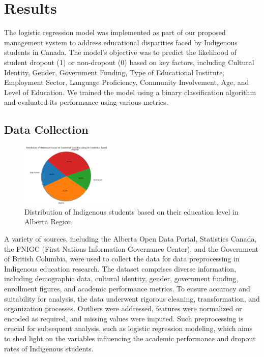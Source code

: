\documentclass[conference]{IEEEtran}
\begin{document}
\section{\textbf{Results}}
The logistic regression model was implemented as part of our proposed management system to address educational disparities faced by Indigenous students in Canada. The model's objective was to predict the likelihood of student dropout (1) or non-dropout (0) based on key factors, including Cultural Identity, Gender, Government Funding, Type of Educational Institute, Employment Sector, Language Proficiency, Community Involvement, Age, and Level of Education. We trained the model using a binary classification algorithm and evaluated its performance using various metrics.


\subsection{\textbf{Data Collection}}

\begin{figure}[H]
	\centering 
	\includegraphics[width=0.4\textwidth, angle=0]{images/DataCollection.png}	
	\caption{Distribution of Indigenous students based on their education level in Alberta Region} 
	\label{fig:datacollection}
\end{figure}

A variety of sources, including the Alberta Open Data Portal, Statistics Canada, the FNIGC (First Nations Information Governance Center), and the Government of British Columbia, were used to collect the data for data preprocessing in Indigenous education research. The dataset comprises diverse information, including demographic data, cultural identity, gender, government funding, enrollment figures, and academic performance metrics. To ensure accuracy and suitability for analysis, the data underwent rigorous cleaning, transformation, and organization processes. Outliers were addressed, features were normalized or encoded as required, and missing values were imputed. Such preprocessing is crucial for subsequent analysis, such as logistic regression modeling, which aims to shed light on the variables influencing the academic performance and dropout rates of Indigenous students.
\end{document}
